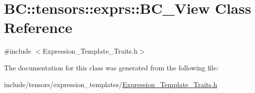 \hypertarget{classBC_1_1tensors_1_1exprs_1_1BC__View}{}\section{BC\+:\+:tensors\+:\+:exprs\+:\+:B\+C\+\_\+\+View Class Reference}
\label{classBC_1_1tensors_1_1exprs_1_1BC__View}


{\ttfamily \#include $<$Expression\+\_\+\+Template\+\_\+\+Traits.\+h$>$}



The documentation for this class was generated from the following file\+:\begin{DoxyCompactItemize}
\item 
include/tensors/expression\+\_\+templates/\hyperlink{Expression__Template__Traits_8h}{Expression\+\_\+\+Template\+\_\+\+Traits.\+h}\end{DoxyCompactItemize}
